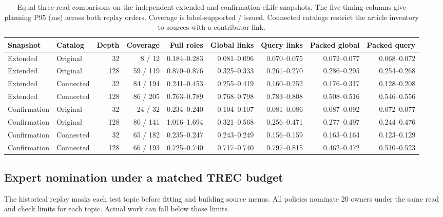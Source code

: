 \begin{table}[t]
\caption{Equal three-read comparisons on the independent extended and confirmation eLife snapshots. The five timing columns give planning P95 (ms) across both replay orders. Coverage is label-supported / issued. Connected catalogs restrict the article inventory to sources with a contributor link.}
\label{tab:held-role-lookup}
\small
\centering
\begin{tabular}{@{}llrrrrrrr@{}}
\toprule
Snapshot & Catalog & Depth & Coverage & Full roles & Global links & Query links & Packed global & Packed query \\
\midrule
Extended & Original & 32 & 8 / 12 & 0.184--0.283 & 0.081--0.096 & 0.070--0.075 & 0.072--0.077 & 0.068--0.072 \\
Extended & Original & 128 & 59 / 119 & 0.870--0.876 & 0.325--0.333 & 0.261--0.270 & 0.286--0.295 & 0.254--0.268 \\
Extended & Connected & 32 & 84 / 194 & 0.241--0.453 & 0.255--0.419 & 0.160--0.252 & 0.176--0.317 & 0.128--0.208 \\
Extended & Connected & 128 & 86 / 205 & 0.763--0.789 & 0.768--0.798 & 0.783--0.808 & 0.508--0.516 & 0.546--0.556 \\
\addlinespace
Confirmation & Original & 32 & 24 / 32 & 0.234--0.240 & 0.104--0.107 & 0.081--0.086 & 0.087--0.092 & 0.072--0.077 \\
Confirmation & Original & 128 & 80 / 141 & 1.016--1.694 & 0.321--0.568 & 0.256--0.471 & 0.277--0.497 & 0.244--0.476 \\
Confirmation & Connected & 32 & 65 / 182 & 0.235--0.247 & 0.243--0.249 & 0.156--0.159 & 0.163--0.164 & 0.123--0.129 \\
Confirmation & Connected & 128 & 66 / 193 & 0.725--0.740 & 0.717--0.740 & 0.797--0.815 & 0.462--0.472 & 0.510--0.523 \\
\bottomrule
\end{tabular}
\end{table}

\subsection{Expert nomination under a matched TREC budget}
The historical replay masks each test topic before fitting and building
source menus. All policies nominate 20 owners under the same read and
check limits for each topic. Actual work can fall below those limits.

